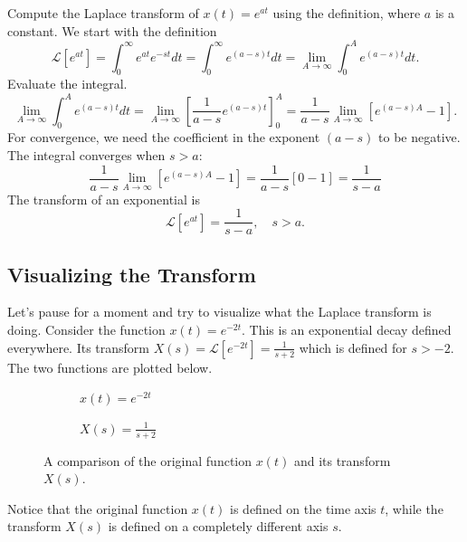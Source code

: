 \documentclass[10pt,letterpaper]{article}
\begin{document}

\begin{example}[2]{
Compute the Laplace transform of $x(t)=e^{at}$ using the definition, where $a$ is a constant.
}
We start with the definition 
\[
\mathcal{L}[e^{at}]=\int_0^\infty e^{at}e^{-st}dt = \int_0^\infty e^{(a-s)t}dt = \lim_{A\to\infty}\int_0^A e^{(a-s)t}dt.
\]
Evaluate the integral.
\[
 \lim_{A\to\infty}\int_0^A e^{(a-s)t}dt=\lim_{A\to\infty} \left[\frac{1}{a-s}e^{(a-s)t}\right]_0^A = \frac{1}{a-s}\lim_{A\to\infty}\left[e^{(a-s)A}-1\right].
\]
For convergence, we need the coefficient in the exponent $(a-s)$ to be negative. The integral converges when $s>a$: 
\[
\frac{1}{a-s}\lim_{A\to\infty}\left[e^{(a-s)A}-1\right] = \frac{1}{a-s}\left[0-1\right] = \frac{1}{s-a}
\]
The transform of an exponential is
\[
\boxed{\mathcal{L}[e^{at}]=\frac{1}{s-a},\quad s>a.}
\]
\end{example}

\subsection{Visualizing the Transform}
Let's pause for a moment and try to visualize what the Laplace transform is doing. Consider the function $x(t)=e^{-2t}$. This is an exponential decay defined everywhere. Its transform $X(s) = \mathcal{L}[e^{-2t}]=\frac{1}{s+2}$ which is defined for $s>-2$. The two functions are plotted below.
\begin{figure}[H]
  \centering
  \begin{subfigure}{0.45\textwidth}
    \centering
{}
\caption{$x(t)=e^{-2t}$}
    \label{fig:sub1}
  \end{subfigure}
  \hfill
  \begin{subfigure}{0.45\textwidth}
    \centering
{}
\caption{$X(s)=\frac{1}{s+2}$}
  \end{subfigure}
  \label{fig:main}
  \caption{A comparison of the original function $x(t)$ and its transform $X(s)$.}
\end{figure}
Notice that the original function $x(t)$ is defined on the time axis $t$, while the transform $X(s)$ is defined on a completely different axis $s$. 
\end{document}
